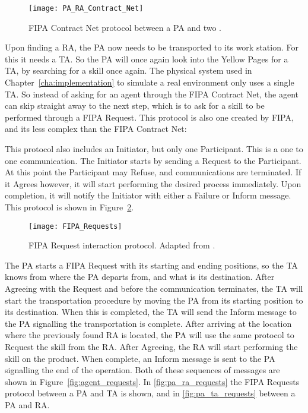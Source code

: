 \begin{figure}[h!]
	\centering
	\texttt{[image: PA\_RA\_Contract\_Net]}
	\captionsetup{justification=centering}
	\caption{\acrshort{FIPA} Contract Net protocol between a \acrlong{PA} and two .}
	\label{fig:pa_ra_contract_net}
\end{figure}

Upon finding a \acrlong{RA}, the \acrlong{PA} now needs to be transported to its work station. For this it needs a \acrlong{TA}. So the \acrshort{PA} will once again look into the Yellow Pages for a \acrshort{TA}, by searching for a skill once again. The physical system used in Chapter~\ref{cha:implementation} to simulate a real environment only uses a single \acrshort{TA}. So instead of asking for an agent through the \acrshort{FIPA} Contract Net, the agent can skip straight away to the next step, which is to ask for a skill to be performed through a \acrshort{FIPA} Request. This protocol is also one created by \acrshort{FIPA}, and its less complex than the \acrshort{FIPA} Contract Net:

This protocol also includes an Initiator, but only one Participant. This is a one to one communication. The Initiator starts by sending a Request to the Participant. At this point the Participant may Refuse, and communications are terminated. If it Agrees however, it will start performing the desired process immediately. Upon completion, it will notify the Initiator with either a Failure or Inform message. This protocol is shown in Figure~\ref{fig:requests_protocol}.\\

\begin{figure}[h!]
	\centering
	\texttt{[image: FIPA\_Requests]}
	\caption{\acrshort{FIPA} Request interaction protocol. Adapted from \cite{FIPA_Request}.}
	\label{fig:requests_protocol}
\end{figure}

The \acrshort{PA} starts a \acrshort{FIPA} Request with its starting and ending positions, so the \acrshort{TA} knows from where the \acrshort{PA} departs from, and what is its destination. After Agreeing with the Request and before the communication terminates, the \acrshort{TA} will start the transportation procedure by moving the \acrshort{PA} from its starting position to its destination. When this is completed, the \acrshort{TA} will send the Inform message to the \acrshort{PA} signalling the transportation is complete. After arriving at the location where the previously found \acrshort{RA} is located, the \acrshort{PA} will use the same protocol to Request the skill from the \acrshort{RA}. After Agreeing, the \acrshort{RA} will start performing the skill on the product. When complete, an Inform message is sent to the \acrshort{PA} signalling the end of the operation. Both of these sequences of messages are shown in Figure~\ref{fig:agent_requests}. In \ref{fig:pa_ra_requests} the \acrshort{FIPA} Requests protocol between a \acrshort{PA} and \acrshort{TA} is shown, and in \ref{fig:pa_ta_requests} between a \acrshort{PA} and \acrshort{RA}.\\

